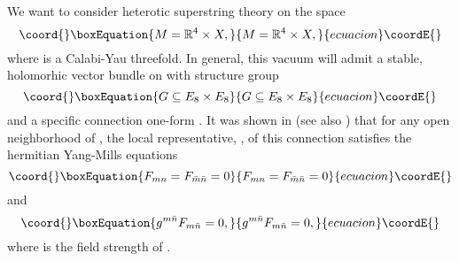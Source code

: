 \documentclass[a4paper,12pt]{article}
\numberwithin{equation}{section}
\theoremstyle{plain}
\begin{document}

We want to consider \coordHE{} heterotic superstring theory on the
space
%
\begin{equation}\coord{}\boxEquation{
M={\mathbb R}^4 \times X,
\label{1}
}{
M={\mathbb R}^4 \times X,
}{ecuacion}\coordE{}\end{equation}
%
where \coordHE{} is a Calabi-Yau threefold. In general, this vacuum will admit a
stable, holomorhic vector bundle \coordHE{} on \coordHE{} with structure group
%
\begin{equation}\coord{}\boxEquation{
G \subseteq E_8 \times E_8
\label{2}
}{
G \subseteq E_8 \times E_8
}{ecuacion}\coordE{}\end{equation}
%
and a specific connection one-form \coordHE{}. It was shown in
\cite{CHSW} (see also \cite{GSW}) that for any open neighborhood of \coordHE{},
the
local representative, \coordHE{}, of this connection satisfies the hermitian
Yang-Mills equations
%
\begin{equation}\coord{}\boxEquation{
F_{mn} = F_{\bar m \bar n} =0
\label{check}
}{
F_{mn} = F_{\bar m \bar n} =0
}{ecuacion}\coordE{}\end{equation}
%
and
%
\begin{equation}\coord{}\boxEquation{
g^{m \bar n}F_{m \bar n} =0,
\label{3}
}{
g^{m \bar n}F_{m \bar n} =0,
}{ecuacion}\coordE{}\end{equation}
%
where \coordHE{} is the field strength of \coordHE{}.
\end{document}
